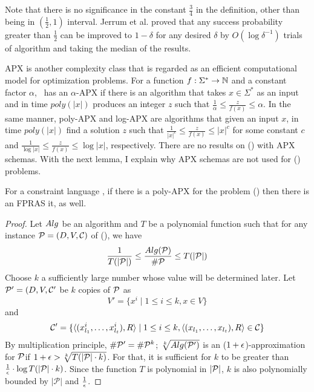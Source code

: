 Note that there is no significance in the constant \(\frac{3}{4}\) in the definition,
other than being in \((\frac{1}{2},1)\) interval. 
Jerrum et al. \cite{JVV} proved that any success probability 
greater than \(\frac{1}{2}\) can be improved to \(1-\delta\) for any desired \(\delta\) by
\(O(\log \delta^{-1})\) trials of algorithm and taking the median of the results.

APX is another complexity class that is regarded as an efficient computational model for
optimization problems.
For a function \(f:\Sigma^*\to\mathbb{N}\) and a constant factor \(\alpha\),
\mf\ has an \(\alpha\)-APX if there is an algorithm that
takes \(x\in\Sigma^*\) as an input and in time \(poly(|x|)\) produces an integer \(z\)
such that \(\frac{1}{\alpha}\le\frac{z}{f(x)}\le \alpha\). In the same manner,
poly-APX and log-APX are algorithms that given an input
\(x\), in time \(poly(|x|)\) find a solution \(z\) 
such that  \(\frac{1}{|x|^c}\le\frac{z}{f(x)}\le |x|^c\) for some constant \(c\) and
\(\frac{1}{\log |x|}\le\frac{z}{f(x)}\le \log |x|\), respectively.
There are no results on \ccsp(\mrelset) with
APX schemas. With the next lemma, I explain why APX schemas are not used for \ccsp(\mrelset) problems.

\begin{lemma}
For a constraint language \mrelset, if there is a poly-APX for
the problem \ccsp(\mrelset) then there is an FPRAS it, as well.
\end{lemma}

\begin{proof}
Let \(Alg\) be an algorithm and \(T\) be a polynomial function such
that for any instance \(\mathcal{P}=(D,V,\mathcal{C})\)
of \ccsp(\mrelset), we have 
\[\frac{1}{T(|\mathcal{P}|)} \le \frac{Alg(\mathcal{P})}{\#\mathcal{P}} \le T(|\mathcal{P}|)\]
Choose \(k\) a sufficiently large number whose value
will be determined later. Let \(\mathcal{P}'=(D, V,\mathcal{C}'\) be \(k\) copies of \(\mathcal{P}\) as
\[V'=\{x^i \mid 1 \le i \le k, x \in V\}\] and
\[\mathcal{C}'=\{\langle (x^i_{l_1},\dotsc, x^i_{l_t}), R \rangle \mid 1 \le i \le k,
\langle (x_{l_1},\dotsc, x_{l_t}), R \rangle \in \mathcal{C}\}\]
By multiplication principle, \(\#\mathcal{P}'=\#\mathcal{P}^k\); \(\sqrt[k]{Alg(\mathcal{P}')}\) is 
an (\(1+\epsilon\))-approximation for \(\mathcal{P}\)\@ if \(1+\epsilon > \sqrt[k]{T(|\mathcal{P}|\cdot k)}\)\@.
For that, it is sufficient for \(k\) to be greater than
\(\frac{1}{\epsilon}\cdot \log T(|\mathcal{P}|\cdot k)\)\@.
Since the function \(T\) is polynomial in \(|\mathcal{P}|\), \(k\) is also polynomially 
bounded by \(|\mathcal{P}|\) and \(\frac{1}{\epsilon}\)\@.
\end{proof}

